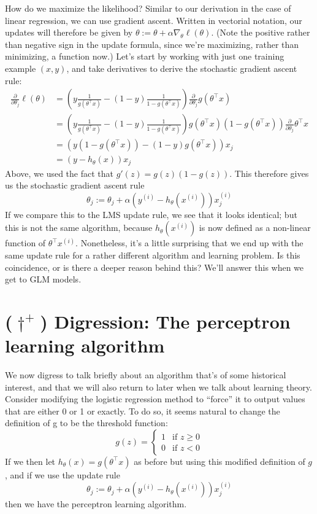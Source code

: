How do we maximize the likelihood? Similar to our derivation in the case
of linear regression, we can use gradient ascent. Written in vectorial notation,
our updates will therefore be given by $\theta := \theta + \alpha \nabla_\theta \ell(\theta)$. (Note the positive
rather than negative sign in the update formula, since we're maximizing,
rather than minimizing, a function now.) Let's start by working with just
one training example $(x,y)$, and take derivatives to derive the stochastic
gradient ascent rule:
\begin{align}
    \frac{\partial}{\partial \theta_j}\ell(\theta) &=
    \left(y \frac{1}{g(\theta^\top x)} - (1-y) \frac{1}{1-g(\theta^\top x)} \right) \frac{\partial}{\partial \theta_j}g(\theta^\top x)\\
    &= \left(y \frac{1}{g(\theta^\top x)} - (1-y) \frac{1}{1-g(\theta^\top x)} \right) g(\theta^\top x) (1 - g(\theta^\top x)) \frac{\partial}{\partial \theta_j}\theta^\top x\\
    &= \left(y (1 - g(\theta^\top x)) - (1-y) g(\theta^\top x)\right) x_j\\
    &= (y - h_\theta(x)) x_j
\end{align}
Above, we used the fact that $g'(z) = g(z)(1 - g(z))$. This therefore gives us
the stochastic gradient ascent rule
\begin{equation}
    \theta_j := \theta_j + \alpha \left( y^{(i)} - h_\theta (x^{(i)}) \right) x^{(i)}_j
\end{equation}
If we compare this to the LMS update rule, we see that it looks identical; but
this is not the same algorithm, because $h_\theta (x^{(i)})$ is now defined as a non-linear
function of $\theta^\top x^{(i)}$. Nonetheless, it's a little surprising that we end up with
the same update rule for a rather different algorithm and learning problem.
Is this coincidence, or is there a deeper reason behind this? We'll answer this
when we get to GLM models.


\section{($\dagger^+$) Digression: The perceptron learning algorithm} %
We now digress to talk briefly about an algorithm that's of some historical
interest, and that we will also return to later when we talk about learning
theory. Consider modifying the logistic regression method to ``force'' it to
output values that are either 0 or 1 or exactly. To do so, it seems natural to
change the definition of g to be the threshold function:
\begin{equation}
    g(z) = \begin{cases}
        1 & \text{if } z \ge 0\\
        0 & \text{if } z < 0
    \end{cases}
\end{equation}
If we then let $h_\theta (x) = g(\theta^\top x)$ as before but using this modified definition of
$g$, and if we use the update rule
\begin{equation}
    \theta_j := \theta_j + \alpha \left( y^{(i)} - h_\theta (x^{(i)} ) \right) x^{(i)}_j    
\end{equation}
then we have the perceptron learning algorithm. %

